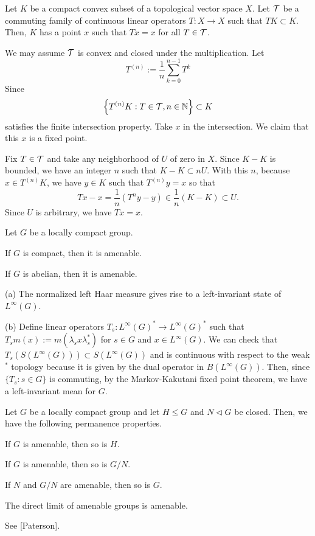 \documentclass{../../../small}
\begin{document}
\begin{lem}
Let $K$ be a compact convex subset of a topological vector space $X$.
Let $\mathcal{T}$ be a commuting family of continuous linear operators $T:X\to X$ such that $TK\subset K$.
Then, $K$ has a point $x$ such that $Tx=x$ for all $T\in\mathcal{T}$.
\end{lem}
\begin{pf}
We may assume $\mathcal{T}$ is convex and closed under the multiplication.
Let
\[T^{(n)}:=\frac1n\sum_{k=0}^{n-1}T^k\]
Since
\[\left\{T^{(n)}K:T\in\mathcal{T},n\in\mathbb{N}\right\}\subset K\]
satisfies the finite intersection property.
Take $x$ in the intersection.
We claim that this $x$ is a fixed point.

Fix $T\in\mathcal{T}$ and take any neighborhood of $U$ of zero in $X$.
Since $K-K$ is bounded, we have an integer $n$ such that $K-K\subset nU$.
With this $n$, because $x\in T^{(n)}K$, we have $y\in K$ such that $T^{(n)}y=x$ so that
\[Tx-x=\frac1n(T^ny-y)\in\frac1n(K-K)\subset U.\]
Since $U$ is arbitrary, we have $Tx=x$.
\end{pf}

\begin{prop}
Let $G$ be a locally compact group.
\begin{parts}
\item If $G$ is compact, then it is amenable.
\item If $G$ is abelian, then it is amenable.
\end{parts}
\end{prop}
\begin{pf}
(a)
The normalized left Haar measure gives rise to a left-invariant state of $L^\infty(G)$.

(b)
Define linear operators $T_s:L^\infty(G)^*\to L^\infty(G)^*$ such that $T_sm(x):=m(\lambda_sx\lambda_s^*)$ for $s\in G$ and $x\in L^\infty(G)$.
We can check that $T_s(S(L^\infty(G)))\subset S(L^\infty(G))$ and is continuous with respect to the weak$^*$ topology because it is given by the dual operator in $B(L^\infty(G))$.
Then, since $\{T_s:s\in G\}$ is commuting, by the Markov-Kakutani fixed point theorem, we have a left-invariant mean for $G$.
\end{pf}

\begin{prop}
Let $G$ be a locally compact group and let $H\le G$ and $N\lhd G$ be closed.
Then, we have the following permanence properties.
\begin{parts}
\item If $G$ is amenable, then so is $H$.
\item If $G$ is amenable, then so is $G/N$.
\item If $N$ and $G/N$ are amenable, then so is $G$.
\item The direct limit of amenable groups is amenable.
\end{parts}
\end{prop}
\begin{pf}
See [Paterson].
\end{pf}
\end{document}
